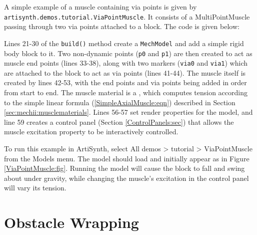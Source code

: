 A simple example of a muscle containing via points is given by 
{\tt artisynth.demos.tutorial.ViaPointMuscle}.  It consists
of a MultiPointMuscle passing through two via points attached to a
block. The code is given below:
\lstset{numbers=left}

\lstset{numbers=none}

Lines 21-30 of the {\tt build()} method create a {\tt MechModel} and
add a simple rigid body block to it. Two non-dynamic points ({\tt p0}
and {\tt p1}) are then created to act as muscle end points
(lines 33-38), along with two markers ({\tt via0} and {\tt via1})
which are attached to the block to act as via points
(lines 41-44). The muscle itself is created by lines 42-53, with the
end points and via points being added in order from start to end.
The muscle material is a 
,
which computes tension according to the simple linear formula 
(\ref{SimpleAxialMuscle:eqn}) described in Section 
\ref{sec:mechii:musclematerials}. Lines 56-57 set render
properties for the model, and line 59 creates a control panel
(Section \ref{ControlPanels:sec}) that allows the muscle {\sf
excitation} property to be interactively controlled.

To run this example in ArtiSynth, select {\sf All demos > tutorial >
ViaPointMuscle} from the {\sf Models} menu. The model should load and
initially appear as in Figure \ref{ViaPointMuscle:fig}.  Running the
model will cause the block to fall and swing about under gravity,
while changing the muscle's {\sf excitation} in the control panel will
vary its tension.

\section{Obstacle Wrapping}
\label{ObstacleWrapping:sec}

